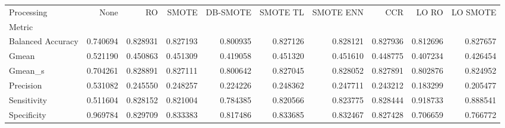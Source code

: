 \begin{tabular}{lrrrrrrrrr}
\toprule
Processing &      None &        RO &     SMOTE &  DB-SMOTE &  SMOTE TL &  SMOTE ENN &       CCR &     LO RO &  LO SMOTE \\
Metric            &           &           &           &           &           &            &           &           &           \\
\midrule
Balanced Accuracy &  0.740694 &  0.828931 &  0.827193 &  0.800935 &  0.827126 &   0.828121 &  0.827936 &  0.812696 &  0.827657 \\
Gmean             &  0.521190 &  0.450863 &  0.451309 &  0.419058 &  0.451320 &   0.451610 &  0.448775 &  0.407234 &  0.426454 \\
Gmean_s           &  0.704261 &  0.828891 &  0.827111 &  0.800642 &  0.827045 &   0.828052 &  0.827891 &  0.802876 &  0.824952 \\
Precision         &  0.531082 &  0.245550 &  0.248257 &  0.224226 &  0.248362 &   0.247711 &  0.243212 &  0.183299 &  0.205477 \\
Sensitivity       &  0.511604 &  0.828152 &  0.821004 &  0.784385 &  0.820566 &   0.823775 &  0.828444 &  0.918733 &  0.888541 \\
Specificity       &  0.969784 &  0.829709 &  0.833383 &  0.817486 &  0.833685 &   0.832467 &  0.827428 &  0.706659 &  0.766772 \\
\bottomrule
\end{tabular}
